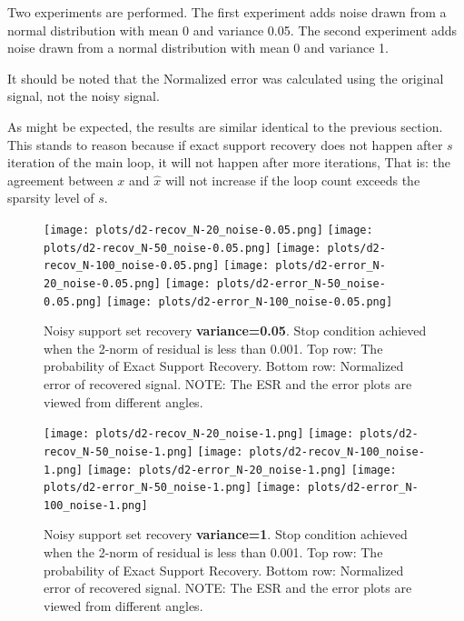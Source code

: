 \documentclass{article}
\begin{document}
Two experiments are performed.
The first experiment adds noise drawn from a normal distribution with mean 0 and variance 0.05.
The second experiment adds noise drawn from a normal distribution with mean 0 and variance 1.

It should be noted that the Normalized error was calculated using the original signal, not the noisy signal.

As might be expected, the results are similar identical to the previous section.
This stands to reason because if exact support recovery does not happen after $s$ iteration of the main loop, it will not happen after more iterations,
That is: the agreement between $x$ and $\hat{x}$ will not increase if the loop count exceeds the sparsity level of $s$.


\begin{figure}[H]
    \captionsetup{width=.75\linewidth}
    \centering
        \texttt{[image: plots/d2-recov\_N-20\_noise-0.05.png]}
        \texttt{[image: plots/d2-recov\_N-50\_noise-0.05.png]}
        \texttt{[image: plots/d2-recov\_N-100\_noise-0.05.png]}
        \newline
        \texttt{[image: plots/d2-error\_N-20\_noise-0.05.png]}
        \texttt{[image: plots/d2-error\_N-50\_noise-0.05.png]}
        \texttt{[image: plots/d2-error\_N-100\_noise-0.05.png]}
        \caption{Noisy support set recovery {\bf variance=0.05}. Stop condition achieved when the 2-norm of residual is less than 0.001. Top row: The probability of Exact Support Recovery. Bottom row: Normalized error of recovered signal. NOTE: The ESR and the error plots are viewed from different angles.}
\end{figure}


\begin{figure}[H]
    \captionsetup{width=.75\linewidth}
    \centering
        \texttt{[image: plots/d2-recov\_N-20\_noise-1.png]}
        \texttt{[image: plots/d2-recov\_N-50\_noise-1.png]}
        \texttt{[image: plots/d2-recov\_N-100\_noise-1.png]}
        \newline
        \texttt{[image: plots/d2-error\_N-20\_noise-1.png]}
        \texttt{[image: plots/d2-error\_N-50\_noise-1.png]}
        \texttt{[image: plots/d2-error\_N-100\_noise-1.png]}
        \caption{Noisy support set recovery {\bf variance=1}. Stop condition achieved when the 2-norm of residual is less than 0.001. Top row: The probability of Exact Support Recovery. Bottom row: Normalized error of recovered signal. NOTE: The ESR and the error plots are viewed from different angles.}
\end{figure}
\end{document}
